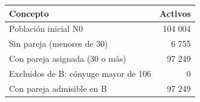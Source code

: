 \begin{tabular}{lr}
\toprule
Concepto & Activos \\
\midrule
Población inicial N0 & 104 004 \\
Sin pareja (menores de 30) & 6 755 \\
Con pareja asignada (30 o más) & 97 249 \\
Excluidos de B: cónyuge mayor de 106 & 0 \\
Con pareja admisible en B & 97 249 \\
\bottomrule
\end{tabular}
